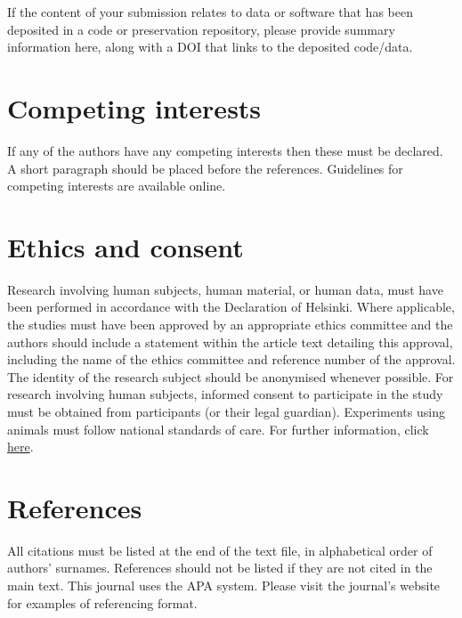 \documentclass{article}
\begin{document}
If the content of your submission relates to data or software
that has been deposited in a code or preservation repository,
please provide summary information here, along with a DOI that
links to the deposited code/data.

\section{Competing interests}

If any of the authors have any competing interests then these
must be declared. A short paragraph should be placed before
the references.
Guidelines for competing interests are available online.%

\section{Ethics and consent}

Research involving human subjects, human material, or human data,
must have been performed in accordance with the Declaration of Helsinki.
Where applicable, the studies must have been approved by an appropriate
ethics committee and the authors should include a statement within
the article text detailing this approval, including the name of the ethics committee and reference number of the approval.
The identity of the research subject should be anonymised whenever possible.
For research involving human subjects, informed consent to participate
in the study must be obtained from participants (or their legal guardian).
%
Experiments using animals must follow national standards of care.
For further information, click \href{http://bit.ly/1rBoe0S}{here}.


\section{References}

All citations must be listed at the end of the text file,
in alphabetical order of authors' surnames.
References should not be listed if they are not cited in
the main text.
This journal uses the APA system.
Please visit the journal's website
for examples of referencing format.
\end{document}
